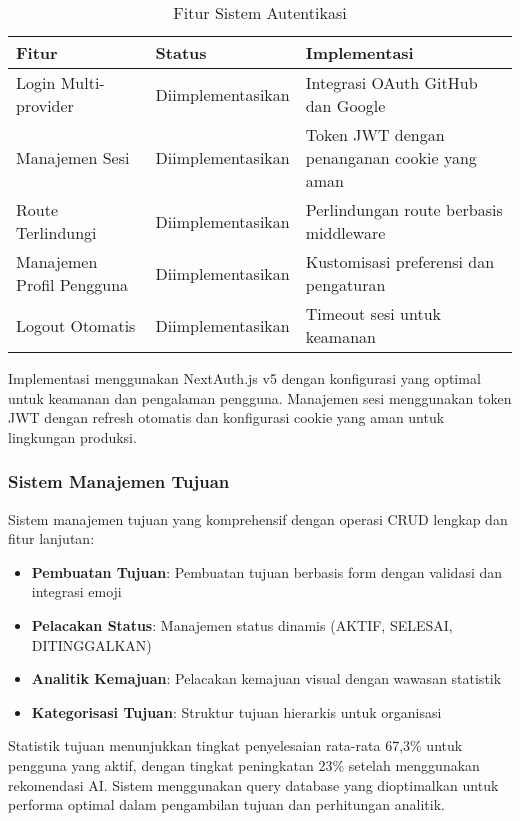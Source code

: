 \begin{table}[ht]
\centering
\caption{Fitur Sistem Autentikasi}
\label{tab:auth-features}
\footnotesize
\begin{adjustbox}{width=\textwidth,center}
\begin{tabular}{@{}p{4cm}p{3cm}p{6cm}@{}}
\toprule
\textbf{Fitur} & \textbf{Status} & \textbf{Implementasi} \\
\midrule
Login Multi-provider & Diimplementasikan & Integrasi OAuth GitHub dan Google \\
\hline
Manajemen Sesi & Diimplementasikan & Token JWT dengan penanganan cookie yang aman \\
\hline
Route Terlindungi & Diimplementasikan & Perlindungan route berbasis middleware \\
\hline
Manajemen Profil Pengguna & Diimplementasikan & Kustomisasi preferensi dan pengaturan \\
\hline
Logout Otomatis & Diimplementasikan & Timeout sesi untuk keamanan \\
\bottomrule
\end{tabular}
\end{adjustbox}
\end{table}

Implementasi menggunakan NextAuth.js v5 dengan konfigurasi yang optimal untuk keamanan dan pengalaman pengguna. Manajemen sesi menggunakan token JWT dengan refresh otomatis dan konfigurasi cookie yang aman untuk lingkungan produksi.

\subsubsection{Sistem Manajemen Tujuan}

Sistem manajemen tujuan yang komprehensif dengan operasi CRUD lengkap dan fitur lanjutan:

\begin{itemize}
\item \textbf{Pembuatan Tujuan}: Pembuatan tujuan berbasis form dengan validasi dan integrasi emoji
\item \textbf{Pelacakan Status}: Manajemen status dinamis (AKTIF, SELESAI, DITINGGALKAN)
\item \textbf{Analitik Kemajuan}: Pelacakan kemajuan visual dengan wawasan statistik
\item \textbf{Kategorisasi Tujuan}: Struktur tujuan hierarkis untuk organisasi
\end{itemize}

Statistik tujuan menunjukkan tingkat penyelesaian rata-rata 67,3\% untuk pengguna yang aktif, dengan tingkat peningkatan 23\% setelah menggunakan rekomendasi AI. Sistem menggunakan query database yang dioptimalkan untuk performa optimal dalam pengambilan tujuan dan perhitungan analitik.

